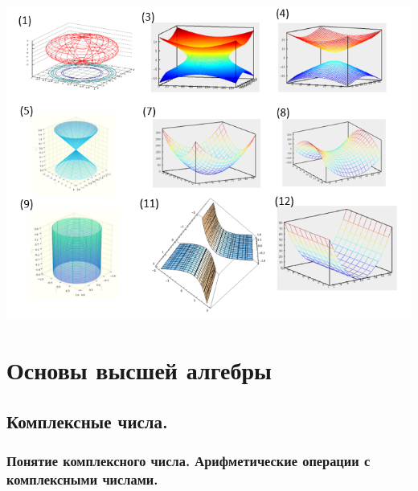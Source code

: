 \documentclass[a4paper, 12pt]{report}
\begin{document}
\begin{center}  
	\includegraphics[width=1\textwidth]{П2П_1.PNG}
\end{center}







\part{Основы высшей алгебры}
\chapter{Комплексные числа.}

\section{Понятие комплексного числа. Арифметические операции с комплексными числами.}
\end{document}
